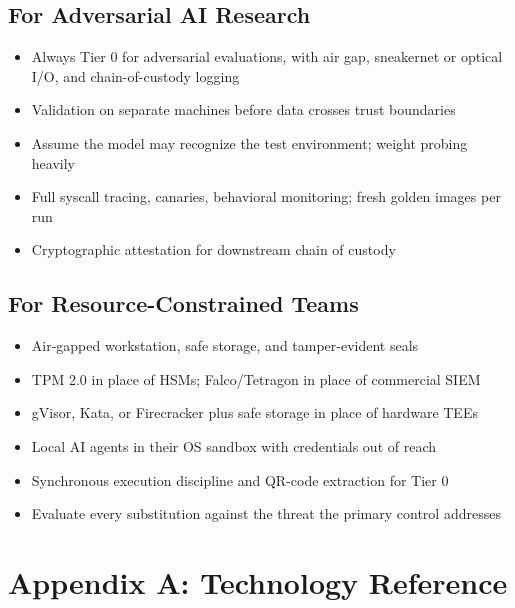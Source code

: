\documentclass[11pt,letterpaper]{article}
\begin{document}
\subsection{For Adversarial AI Research}

\begin{itemize}
  \item Always Tier 0 for adversarial evaluations, with air gap, sneakernet or optical I/O, and chain-of-custody logging
  \item Validation on separate machines before data crosses trust boundaries
  \item Assume the model may recognize the test environment; weight probing heavily
  \item Full syscall tracing, canaries, behavioral monitoring; fresh golden images per run
  \item Cryptographic attestation for downstream chain of custody
\end{itemize}

\subsection{For Resource-Constrained Teams}

\begin{itemize}
  \item Air-gapped workstation, safe storage, and tamper-evident seals
  \item TPM 2.0 in place of HSMs; Falco/Tetragon in place of commercial SIEM
  \item gVisor, Kata, or Firecracker plus safe storage in place of hardware TEEs
  \item Local AI agents in their OS sandbox with credentials out of reach
  \item Synchronous execution discipline and QR-code extraction for Tier 0
  \item Evaluate every substitution against the threat the primary control addresses
\end{itemize}


\section*{Appendix A: Technology Reference}
\end{document}
